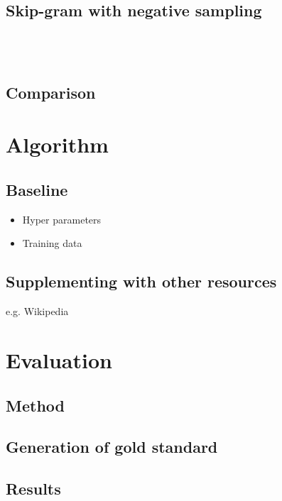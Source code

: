 \documentclass{scrartcl} %
\begin{document}
\subsection{Skip-gram with negative sampling}
\citeauthor{Mikolov2013} \cite{Mikolov2013}\\
\citeauthor{Levy2015} \cite{Levy2015}\\
\citeauthor{Goldberg14} \cite{Goldberg14}

\subsection{Comparison}

\section{Algorithm}

\subsection{Baseline}
\begin{itemize}
\item Hyper parameters
\item Training data
\end{itemize}

\subsection{Supplementing with other resources}
e.g. Wikipedia

\section{Evaluation}

\subsection{Method}
\citeauthor{Dellschaft2006} \cite{Dellschaft2006}

\subsection{Generation of gold standard}

\subsection{Results}



\end{document}
